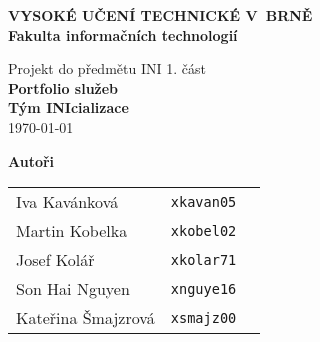 \begin{titlepage}
    \centering

    {\fontsize{20pt}{15pt}\bfseries
    VYSOKÉ UČENÍ TECHNICKÉ V~BRNĚ\\
    \vspace{8pt}
    Fakulta informačních technologií
    }

    \begin{figure}[t]
        
    \end{figure}

    \vspace{22pt}

    {\Large Projekt do předmětu INI 1. část\\}
    \vspace{4pt}
    {\LARGE \bfseries Portfolio služeb\\}
    \vspace{120pt}
    {\Large \bfseries Tým INIcializace\\}
    \vspace{120pt}
    {\Large \today}

    \vspace{100pt}
    {\Large \bfseries Autoři\\}
    \vspace{12pt}

    \begin{tabular}{ l c r }
        Iva Kavánková & \texttt{xkavan05} \\
        Martin Kobelka & \texttt{xkobel02} \\
        Josef Kolář & \texttt{xkolar71} \\
        Son Hai Nguyen & \texttt{xnguye16} \\
        Kateřina Šmajzrová & \texttt{xsmajz00} \\
    \end{tabular}\\

\end{titlepage}